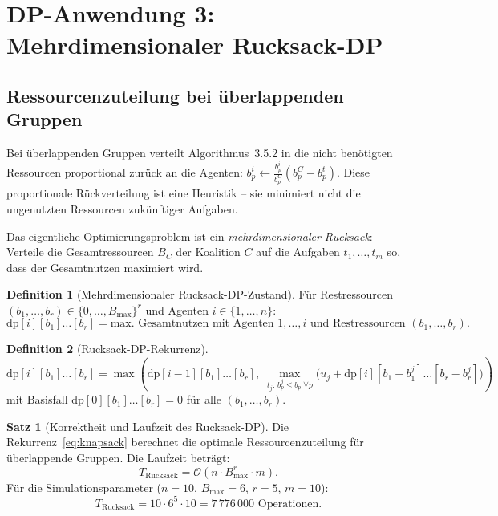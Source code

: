 ﻿\documentclass[a4paper,12pt]{article}
\theoremstyle{definition}
\newtheorem{definition}{Definition}
\newtheorem{satz}{Satz}
\begin{document}
\section{DP-Anwendung 3: Mehrdimensionaler Rucksack-DP}

\subsection{Ressourcenzuteilung bei \"{u}berlappenden Gruppen}

Bei \"{u}berlappenden Gruppen verteilt Algorithmus~3.5.2 in \cite{sk98} die nicht
ben\"{o}tigten Ressourcen proportional zur\"{u}ck an die Agenten:
$b_p^i \leftarrow \frac{b_p^i}{b_p^C}(b_p^C - b_p^t)$.
Diese proportionale R\"{u}ckverteilung ist eine Heuristik -- sie minimiert
nicht die ungenutzten Ressourcen zuk\"{u}nftiger Aufgaben.

Das eigentliche Optimierungsproblem ist ein \emph{mehrdimensionaler Rucksack}:
Verteile die Gesamtressourcen $B_C$ der Koalition $C$ auf die Aufgaben
$t_1, \ldots, t_m$ so, dass der Gesamtnutzen maximiert wird.

\begin{definition}[Mehrdimensionaler Rucksack-DP-Zustand]
    F\"{u}r Restressourcen $(b_1, \ldots, b_r) \in \{0, \ldots, B_{\max}\}^r$
    und Agenten $i \in \{1, \ldots, n\}$:
    \[
        \mathrm{dp}[i][b_1]\ldots[b_r] =
        \text{max. Gesamtnutzen mit Agenten } 1, \ldots, i
        \text{ und Restressourcen } (b_1, \ldots, b_r).
    \]
\end{definition}

\begin{definition}[Rucksack-DP-Rekurrenz]
    \begin{equation}
        \mathrm{dp}[i][b_1]\ldots[b_r] =
        \max\!\left(
            \mathrm{dp}[i-1][b_1]\ldots[b_r],\;
            \max_{t_j:\, b_p^j \leq b_p\; \forall p} \!\!
            \bigl(u_j + \mathrm{dp}[i][b_1 - b_1^j]\ldots[b_r - b_r^j]\bigr)
        \right)
        \label{eq:knapsack}
    \end{equation}
    mit Basisfall $\mathrm{dp}[0][b_1]\ldots[b_r] = 0$ f\"{u}r alle $(b_1,\ldots,b_r)$.
\end{definition}

\begin{satz}[Korrektheit und Laufzeit des Rucksack-DP]
    \label{satz:knapsack}
    Die Rekurrenz~\eqref{eq:knapsack} berechnet die optimale Ressourcenzuteilung
    f\"{u}r \"{u}berlappende Gruppen. Die Laufzeit betr\"{a}gt:
    \[
        T_{\mathrm{Rucksack}} = \mathcal{O}\!\left(n \cdot B_{\max}^r \cdot m\right).
    \]
    F\"{u}r die Simulationsparameter ($n = 10$, $B_{\max} = 6$, $r = 5$, $m = 10$):
    \[
        T_{\mathrm{Rucksack}} = 10 \cdot 6^5 \cdot 10 = 7\,776\,000 \text{ Operationen}.
    \]
\end{satz}
\end{document}
